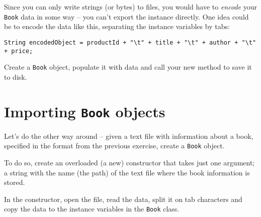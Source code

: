 \documentclass[a4paper, english]{article}
\begin{document}
        Since you can only write strings (or bytes) to files, you would have to \emph{encode} your \texttt{Book} data in some way -- you can't export the instance directly. One idea could be to encode the data like this, separating the instance variables by tabs:

        \begin{lstlisting}[style=customjava]
String encodedObject = productId + "\t" + title + "\t" + author + "\t" + price;\end{lstlisting}

        Create a \texttt{Book} object, populate it with data and call your new method to save it to disk.

    \section{Importing \texttt{Book} objects}
        Let's do the other way around -- given a text file with information about a book, specified in the format from the previous exercise, create a \texttt{Book} object.

        To do so, create an overloaded (a new) constructor that takes just one argument; a string with the name (the path) of the text file where the book information is stored.

        In the constructor, open the file, read the data, split it on tab characters and copy the data to the instance variables in the \texttt{Book} class.
\end{document}

